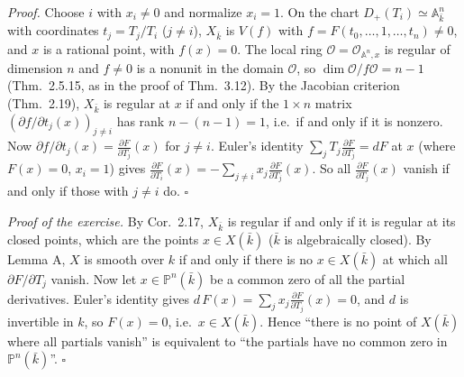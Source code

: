 \documentclass[11pt]{article}
\begin{document}
\emph{Proof.} Choose $i$ with $x_i\neq0$ and normalize $x_i=1$. On the chart $D_+(T_i)\simeq\mathbb A^n_{\bar k}$ with coordinates $t_j=T_j/T_i$ ($j\ne i$), $X_{\bar k}$ is $V(f)$ with $f=F(t_0,\dots,1,\dots,t_n)\neq0$, and $x$ is a rational point, with $f(x)=0$. The local ring $\mathcal O=\mathcal O_{\mathbb A^n,x}$ is regular of dimension $n$ and $f\neq0$ is a nonunit in the domain $\mathcal O$, so $\dim\mathcal O/f\mathcal O=n-1$ (Thm.~2.5.15, as in the proof of Thm.~3.12). By the Jacobian criterion (Thm.~2.19), $X_{\bar k}$ is regular at $x$ if and only if the $1\times n$ matrix $(\partial f/\partial t_j(x))_{j\neq i}$ has rank $n-(n-1)=1$, i.e.\ if and only if it is nonzero. Now $\partial f/\partial t_j(x)=\frac{\partial F}{\partial T_j}(x)$ for $j\neq i$. Euler's identity $\sum_jT_j\frac{\partial F}{\partial T_j}=dF$ at $x$ (where $F(x)=0$, $x_i=1$) gives $\frac{\partial F}{\partial T_i}(x)=-\sum_{j\neq i}x_j\frac{\partial F}{\partial T_j}(x)$. So all $\frac{\partial F}{\partial T_j}(x)$ vanish if and only if those with $j\ne i$ do. $\square$

\emph{Proof of the exercise.} By Cor.~2.17, $X_{\bar k}$ is regular if and only if it is regular at its closed points, which are the points $x\in X(\bar k)$ ($\bar k$ is algebraically closed). By Lemma A, $X$ is smooth over $k$ if and only if there is no $x\in X(\bar k)$ at which all $\partial F/\partial T_j$ vanish. Now let $x\in\mathbb P^n(\bar k)$ be a common zero of all the partial derivatives. Euler's identity gives $d\,F(x)=\sum_jx_j\frac{\partial F}{\partial T_j}(x)=0$, and $d$ is invertible in $k$, so $F(x)=0$, i.e.\ $x\in X(\bar k)$. Hence ``there is no point of $X(\bar k)$ where all partials vanish'' is equivalent to ``the partials have no common zero in $\mathbb P^n(\bar k)$''. \hfill$\square$
\end{document}

